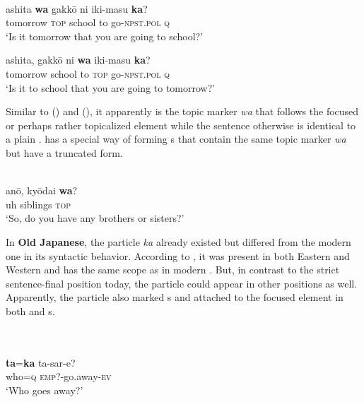 \ea%
    \label{ex:japa:3}
    \\
    \ea
    \gll ashita \textbf{{wa}} gakk\=o  ni  iki-masu \textbf{{ka}}?\\
    tomorrow  \textsc{top}  school  to  go-\textsc{npst.pol}  \textsc{q}\\
    \glt ‘Is it tomorrow that you are going to school?’
    
    \ex
    \gll ashita,    gakk\=o  ni \textbf{{wa}} iki-masu \textbf{{ka}}?\\
    tomorrow  school  to  \textsc{top}  go-\textsc{npst.pol}  \textsc{q}\\
    \glt ‘Is it to school that you are going to tomorrow?’
    \z
    \z

\noindent Similar to  () and  (), it apparently is the topic marker \textit{wa} that follows the focused or perhaps rather topicalized element while the sentence otherwise is identical to a plain .  has a special way of forming s that contain the same topic marker \textit{wa} but have a truncated form.

\ea%
    \label{ex:japa:4}
    \\
    \gll an\=o,  ky\=odai \textbf{{wa}}?\\
    uh  siblings  \textsc{top}\\
    \glt ‘So, do you have any brothers or sisters?’ \citep[166]{Hinds1984}
    \z

In \textbf{Old Japanese}, the particle \textit{ka} already existed but differed from the modern  one in its syntactic behavior. According to \citet[1220]{Vovin2009}, it was present in both Eastern and Western  and has the same scope as in modern . But, in contrast to the strict sentence-final position today, the particle could appear in other positions as well. Apparently, the particle also marked s and attached to the focused element in both  and s.

\ea%
    \label{ex:japa:5}
    \\
    \ea
    \\
    \gll \textbf{{ta}}=\textbf{{ka}} ta-sar-e?\\
    who=\textsc{q}    \textsc{emp}?-go.away-\textsc{ev}\\
    \glt ‘Who goes away?’
    

